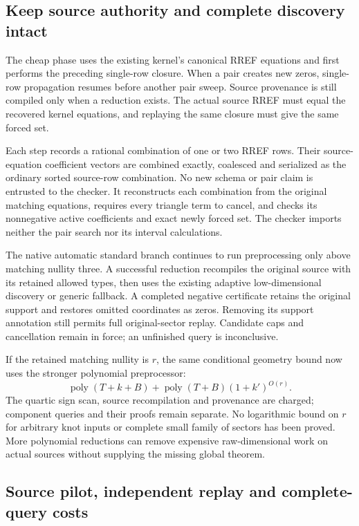 \subsection{Keep source authority and complete discovery intact}

The cheap phase uses the existing kernel's canonical RREF equations and
first performs the preceding single-row closure. When a pair creates new
zeros, single-row propagation resumes before another pair sweep. Source
provenance is still compiled only when a reduction exists. The actual source
RREF must equal the recovered kernel equations, and replaying the same
closure must give the same forced set.

Each step records a rational combination of one or two RREF rows. Their
source-equation coefficient vectors are combined exactly, coalesced and
serialized as the ordinary sorted source-row combination. No new schema or
pair claim is entrusted to the checker. It reconstructs each combination
from the original matching equations, requires every triangle term to cancel,
and checks its nonnegative active coefficients and exact newly forced set.
The checker imports neither the pair search nor its interval calculations.

The native automatic standard branch continues to run preprocessing only
above matching nullity three. A successful reduction recompiles the original
source with its retained allowed types, then uses the existing adaptive
low-dimensional discovery or generic fallback. A completed negative
certificate retains the original support and restores omitted coordinates
as zeros. Removing its support annotation still permits full original-sector
replay. Candidate caps and cancellation remain in force; an unfinished
query is inconclusive.

If the retained matching nullity is $r$, the same conditional geometry bound
now uses the stronger polynomial preprocessor:
\[
 \operatorname{poly}(T+k+B)+\operatorname{poly}(T+B)(1+k')^{O(r)}.
\]
The quartic sign scan, source recompilation and provenance are charged;
component queries and their proofs remain separate. No logarithmic bound
on $r$ for arbitrary knot inputs or complete small family of sectors has
been proved. More polynomial reductions can remove expensive raw-dimensional
work on actual sources without supplying the missing global theorem.

\subsection{Source pilot, independent replay and complete-query costs}

